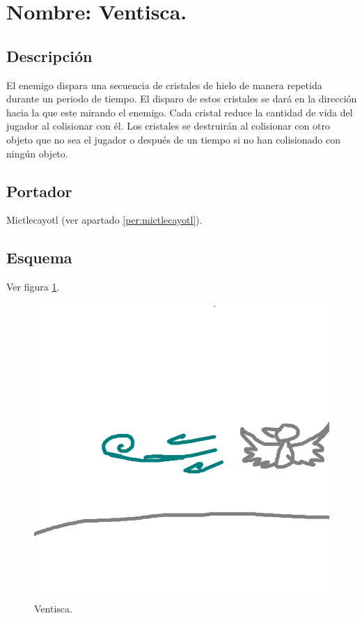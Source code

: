 \section{Nombre: Ventisca.} \label{ventisca}
\subsection{Descripción}
El enemigo dispara una secuencia de cristales de hielo de manera repetida durante un periodo de tiempo. El disparo de estos cristales se dará en la dirección hacia la que este mirando el enemigo. Cada cristal reduce la cantidad de vida del jugador al colisionar con él. Los cristales se destruirán al colisionar con otro objeto que no sea el jugador o después de un tiempo si no han colisionado con ningún objeto.
\subsection{Portador}
Mictlecayotl (ver apartado \ref{per:mictlecayotl}).
\subsection{Esquema}
			Ver figura \ref{fig:ventisca}.
			\begin{figure}
				\centering
				\includegraphics[height=0.2 \textheight]{Imagenes/ventisca}
				\caption{Ventisca.}
				\label{fig:ventisca}
			\end{figure}